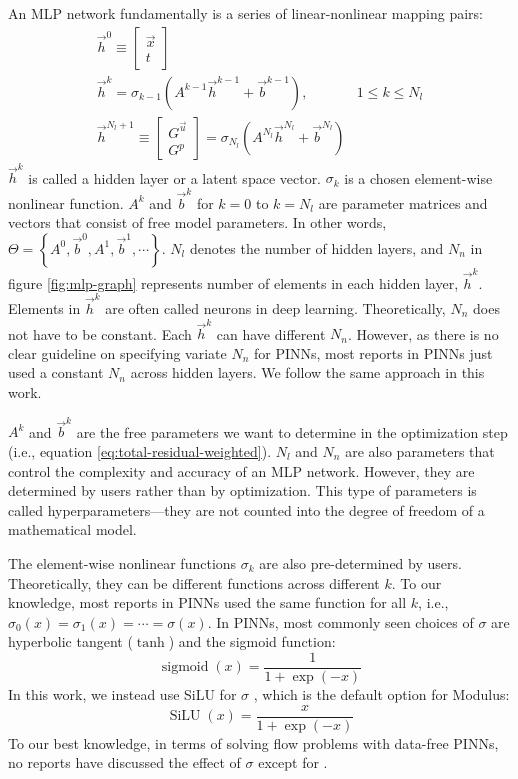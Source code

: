 An MLP network fundamentally is a series of linear-nonlinear mapping pairs:
\begin{equation}\label{eq:mlp-formula}
    \begin{array}{ll}
        \vec{h}^0 \equiv \begin{bmatrix} \vec{x} \\ t \end{bmatrix} & \\
        \vec{h}^k = \sigma_{k-1}\left(A^{k-1}\vec{h}^{k-1}+\vec{b}^{k-1}\right)\text{,} & 1 \le k \le N_l \\
        \vec{h}^{N_l+1}\equiv \begin{bmatrix} G^{\vec{u}} \\ G^p \end{bmatrix} = \sigma_{N_l}\left(A^{N_l}\vec{h}^{N_l}+\vec{b}^{N_l}\right) &
    \end{array}
\end{equation}
$\vec{h}^k$ is called a hidden layer or a latent space vector.
$\sigma_{k}$ is a chosen element-wise nonlinear function.
$A^{k}$ and $\vec{b}^k$ for $k=0$ to $k=N_l$ are parameter matrices and vectors that consist of free model parameters.
In other words, $\Theta=\left\{A^0, \vec{b}^0, A^1, \vec{b}^1, \cdots \right\}$.
$N_l$ denotes the number of hidden layers, and $N_n$ in figure \ref{fig:mlp-graph} represents number of elements in each hidden layer, $\vec{h}^k$.
Elements in $\vec{h}^k$ are often called neurons in deep learning.
Theoretically, $N_n$ does not have to be constant.
Each $\vec{h}^k$ can have different $N_n$.
However, as there is no clear guideline on specifying variate $N_n$ for PINNs, most reports in PINNs just used a constant $N_n$ across hidden layers.
We follow the same approach in this work.

$A^k$ and $\vec{b}^k$ are the free parameters we want to determine in the optimization step (i.e., equation \eqref{eq:total-residual-weighted}).
$N_l$ and $N_n$ are also parameters that control the complexity and accuracy of an MLP network.
However, they are determined by users rather than by optimization.
This type of parameters is called hyperparameters---they are not counted into the degree of freedom of a mathematical model.

The element-wise nonlinear functions $\sigma_{k}$ are also pre-determined by users.
Theoretically, they can be different functions across different $k$.
To our knowledge, most reports in PINNs used the same function for all $k$, i.e., $\sigma_0(x)=\sigma_1(x)=\cdots=\sigma(x)$.
In PINNs, most commonly seen choices of $\sigma$ are hyperbolic tangent ($\tanh$) and the sigmoid function:
\begin{equation}
    \operatorname{sigmoid}(x) = \frac{1}{1+\exp(-x)}
\end{equation}
In this work, we instead use SiLU for $\sigma$ \cite{hendrycks_gaussian_2020}, which is the default option for Modulus:
\begin{equation}\label{eq:silu}
    \operatorname{SiLU}(x) = \frac{x}{1+\exp(-x)}
\end{equation}
To our best knowledge, in terms of solving flow problems with data-free PINNs, no reports have discussed the effect of $\sigma$ except for \cite{li_integration_2010}.

